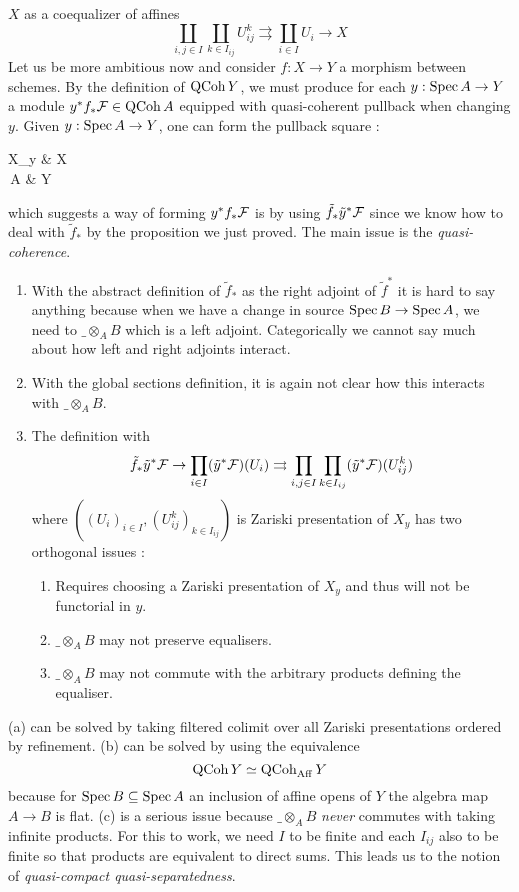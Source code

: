 \documentclass[./main.tex]{subfiles}
\begin{document}
$X$ as a coequalizer of affines \[
  \coprod_{ i ,j \in I} \coprod_{k \in I_{ij}} U_{ij}^k \rightrightarrows
  \coprod_{i \in I} U_i \to X
\]
Let us be more ambitious now and consider 
$f : X \to Y$ a morphism between schemes.
By the definition of $\operatorname{QCoh} Y$,
we must produce for each $y : \operatorname{Spec} A \to Y$
a module $y^*f_* \mathcal{F} \in \operatorname{QCoh} A$
equipped with quasi-coherent pullback when changing $y$.
Given $y : \operatorname{Spec} A \to Y$, one can form the pullback square : 
\begin{cd}
  {X_y} & X \\
	{\,A} & Y
	\arrow["y"', from=2-1, to=2-2]
	\arrow["f", from=1-2, to=2-2]
	\arrow["{\tilde{y}}", from=1-1, to=1-2]
	\arrow["{\tilde{f}}"', from=1-1, to=2-1]
	\arrow["\lrcorner"{anchor=center, pos=0.125}, draw=none, from=1-1, to=2-2]
\end{cd}
which suggests a way of forming $y^* f_* \mathcal{F}$ is
by using $\tilde{f}_* \tilde{y}^* \mathcal{F}$ since 
we know how to deal with $\tilde{f}_*$
by the proposition we just proved.
The main issue is the \emph{quasi-coherence}.
\begin{enumerate}
  \item With the abstract definition of $\tilde{f}_*$ as the right adjoint
  of $\tilde{f}^*$ it is hard to say anything because
  when we have a change in source $\operatorname{Spec} B \to \operatorname{Spec} A$,
  we need to $\_ \otimes_A B$ which is a left adjoint.
  Categorically we cannot say much about how left and right adjoints
  interact.
  \item With the global sections definition,
  it is again not clear how this interacts with $\_ \otimes_A B$.
  \item The definition with \[
    \tilde{f}_*\tilde{y}^*\mathcal{F} \to 
    \prod_{i \in I}(\tilde{y}^*\mathcal{F})(U_i) \rightrightarrows
    \prod_{i , j \in I} \prod_{k \in I_{ij}} (\tilde{y}^*\mathcal{F})(U_{ij}^k)
  \]
  where $((U_i)_{i \in I} , (U_{ij}^k)_{k \in I_{ij}})$ 
  is Zariski presentation of $X_y$
  has two orthogonal issues : 
  \begin{enumerate}
    \item Requires choosing a Zariski presentation of $X_y$
    and thus will not be functorial in $y$.
    \item $\_ \otimes_A B$ may not preserve equalisers.
    \item $\_ \otimes_A B$ may not commute with the
    arbitrary products defining the equaliser.
  \end{enumerate}
\end{enumerate}
(a) can be solved by taking filtered colimit over
all Zariski presentations ordered by refinement.
(b) can be solved by using the equivalence \[
  \operatorname{QCoh} Y \simeq \operatorname{QCoh}_{\mathrm{Aff}} Y  
\]
because for $\operatorname{Spec} B \subseteq \operatorname{Spec} A$ an inclusion of affine opens of $Y$
the algebra map $A \to B$ is flat.
(c) is a serious issue because
$\_ \otimes_A B$ \emph{never} commutes with taking infinite products.
For this to work,
we need $I$ to be finite and each $I_{ij}$ also to be finite
so that products are equivalent to direct sums.
This leads us to the notion of \emph{quasi-compact quasi-separatedness}.
\end{document}
